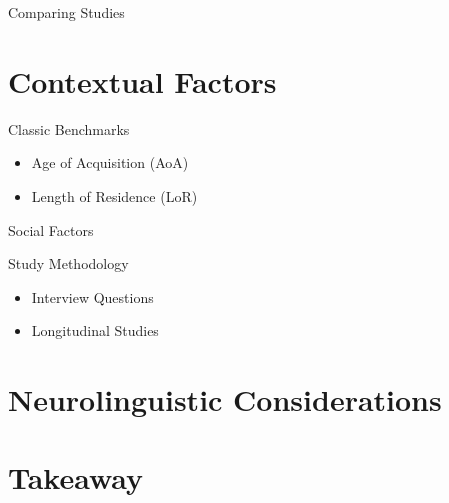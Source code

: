\documentclass{beamer}
\begin{document}
\begin{frame}{Comparing Studies} %
\end{frame}

\section{Contextual Factors}

\begin{frame}{Classic Benchmarks} %
    \begin{itemize}
        \item Age of Acquisition (AoA)
        \item Length of Residence (LoR)

    \end{itemize}
\end{frame}

\begin{frame}{Social Factors} %
\end{frame}

\begin{frame}{Study Methodology}
    \begin{itemize}
        \item Interview Questions
        \item Longitudinal Studies
    \end{itemize}
\end{frame}

\section{Neurolinguistic Considerations}

\section{Takeaway}
\end{document}
